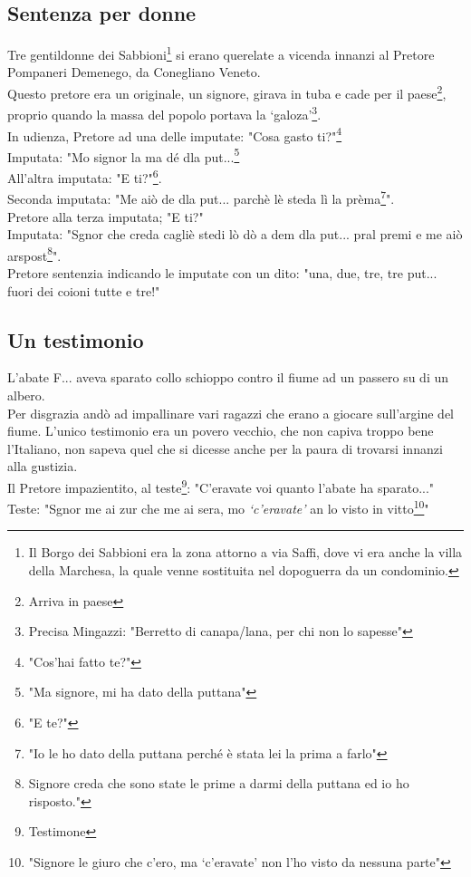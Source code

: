 \subsection{Sentenza per donne}
Tre gentildonne dei Sabbioni\footnote{Il Borgo dei Sabbioni era la zona attorno a via Saffi, dove vi era anche la villa della Marchesa, la quale venne sostituita nel dopoguerra da un condominio.} si erano querelate a vicenda innanzi al Pretore Pompaneri Demenego, da Conegliano Veneto.\\
Questo pretore era un originale, un signore, girava in tuba e cade per il paese\footnote{Arriva in paese}, proprio quando la massa del popolo portava la ‘galoza'\footnote{Precisa Mingazzi: "Berretto di canapa/lana, per chi non lo sapesse"}.\\
In udienza, Pretore ad una delle imputate: "Cosa gasto ti?"\footnote{"Cos'hai fatto te?"}\\
Imputata: "Mo signor la ma dé dla put...\footnote{"Ma signore, mi ha dato della puttana"}\\
All'altra imputata: "E ti?"\footnote{"E te?"}.\\
Seconda imputata: "Me aiò de dla put... parchè lè steda lì la prèma\footnote{"Io le ho dato della puttana perché è stata lei la prima a farlo"}".\\
Pretore alla terza imputata; "E ti?"\\
Imputata: "Sgnor che creda cagliè stedi lò dò a dem dla put... pral premi e me aiò arspost\footnote{Signore creda che sono state le prime a darmi della puttana ed io ho risposto."}".\\
Pretore sentenzia indicando le imputate con un dito: "una, due, tre, tre put... fuori dei coioni tutte e tre!"

\subsection{Un testimonio}
L'abate F\:.\:.\:. aveva sparato collo schioppo contro il fiume ad un passero su di un albero.\\
Per disgrazia andò ad impallinare vari ragazzi che erano a giocare sull'argine del fiume. L'unico testimonio era un povero vecchio, che non capiva troppo bene l'Italiano, non sapeva quel che si dicesse anche per la paura di trovarsi innanzi alla gustizia.	\\
Il Pretore impazientito, al teste\footnote{Testimone}: "C'eravate voi quanto l'abate ha sparato..."\\
Teste: "Sgnor me ai zur che me ai sera, mo \emph{‘c'eravate'} an lo visto in vitto\footnote{"Signore le giuro che c'ero, ma ‘c'eravate' non l'ho visto da nessuna parte"}"

